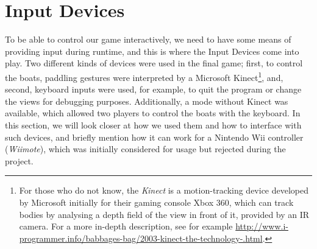 \section{Input Devices}
To be able to control our game interactively, we need to have some means of providing input during runtime, and this is where the Input Devices come into play. Two different kinds of devices were used in the final game; first, to control the boats, paddling gestures were interpreted by a Microsoft Kinect\footnote{For those who do not know, the \emph{Kinect} is a motion-tracking device developed by Microsoft initially for their gaming console Xbox 360, which can track bodies by analysing a depth field of the view in front of it, provided by an IR camera. For a more in-depth description, see for example \url{http://www.i-programmer.info/babbages-bag/2003-kinect-the-technology-.html}.}, and, second, keyboard inputs were used, for example, to quit the program or change the views for debugging purposes. Additionally, a mode without Kinect was available, which allowed two players to control the boats with the keyboard. In this section, we will look closer at how we used them and how to interface with such devices, and briefly mention how it can work for a Nintendo Wii controller (\emph{Wiimote}), which was initially considered for usage but rejected during the project.


